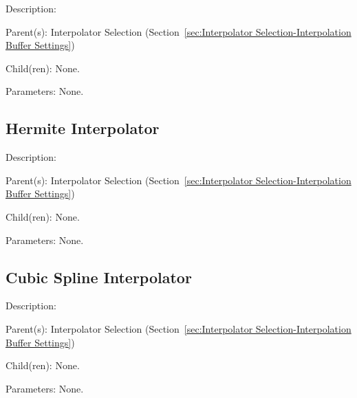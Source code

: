 \begin{list}{}
  {\setlength{\leftmargin}{1.0in}
   \setlength{\labelwidth}{0.75in}
   \setlength{\labelsep}{0.125in}}
  \item[Description:]
  \item[Parent(s):]
    Interpolator Selection (Section~\ref{sec:Interpolator Selection-Interpolation Buffer Settings})
  \item[Child(ren):]
    None. 
  \item[Parameters:]
    None. 
\end{list}

\subsection{Hermite Interpolator}
\label{sec:Hermite Interpolator-Interpolator Selection}

\begin{list}{}
  {\setlength{\leftmargin}{1.0in}
   \setlength{\labelwidth}{0.75in}
   \setlength{\labelsep}{0.125in}}
  \item[Description:]
  \item[Parent(s):]
    Interpolator Selection (Section~\ref{sec:Interpolator Selection-Interpolation Buffer Settings})
  \item[Child(ren):]
    None. 
  \item[Parameters:]
    None. 
\end{list}

\subsection{Cubic Spline Interpolator}
\label{sec:Cubic Spline Interpolator-Interpolator Selection}

\begin{list}{}
  {\setlength{\leftmargin}{1.0in}
   \setlength{\labelwidth}{0.75in}
   \setlength{\labelsep}{0.125in}}
  \item[Description:]
  \item[Parent(s):]
    Interpolator Selection (Section~\ref{sec:Interpolator Selection-Interpolation Buffer Settings})
  \item[Child(ren):]
    None. 
  \item[Parameters:]
    None. 
\end{list}
